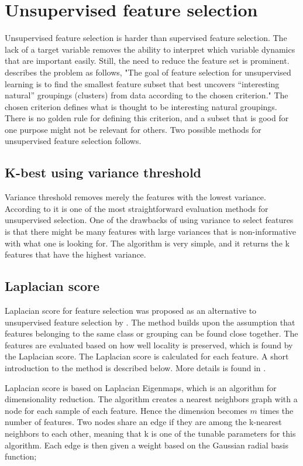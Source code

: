 \section{Unsupervised feature selection}\label{sec:unsup_feat_reduc}
    Unsupervised feature selection is harder than supervised feature selection. The lack of a target variable removes the ability to interpret which variable dynamics that are important easily. Still, the need to reduce the feature set is prominent. \cite{Dy2004} describes the problem as follows, "The goal of feature selection for unsupervised learning is to find the smallest feature subset that best uncovers “interesting natural” groupings (clusters) from data according to the chosen criterion." The chosen criterion defines what is thought to be interesting natural groupings. There is no golden rule for defining this criterion, and a subset that is good for one purpose might not be relevant for others. Two possible methods for unsupervised feature selection follows.
    
    
    \subsection{K-best using variance threshold}\label{subsec:var_thres}
        Variance threshold removes merely the features with the lowest variance. According to \cite{He2005} it is one of the most straightforward evaluation methods for unsupervised selection. One of the drawbacks of using variance to select features is that there might be many features with large variances that is non-informative with what one is looking for. The algorithm is very simple, and it returns the k features that have the highest variance. 
        
    
    \subsection{Laplacian score}\label{subsec:lapl_score}
        Laplacian score for feature selection was proposed as an alternative to unsupervised feature selection by \cite{He2005}. The method builds upon the assumption that features belonging to the same class or grouping can be found close together. The features are evaluated based on how well locality is preserved, which is found by the Laplacian score. The Laplacian score is calculated for each feature. A short introduction to the method is described below. More details is found in \cite{He2005}. 
        
        Laplacian score is based on Laplacian Eigenmaps, which is an algorithm for dimensionality reduction. The algorithm creates a nearest neighbors graph with a node for each sample of each feature. Hence the dimension becomes $m$ times the number of features. Two nodes share an edge if they are among the k-nearest neighbors to each other, meaning that k is one of the tunable parameters for this algorithm. Each edge is then given a weight based on the Gaussian radial basis function;
        
